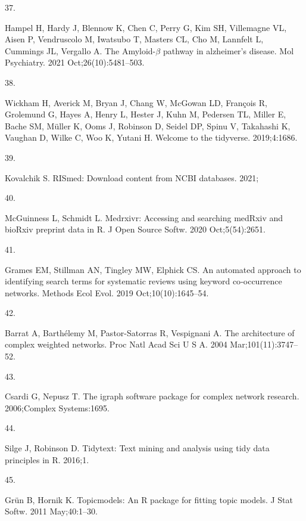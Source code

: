 \documentclass[
  a4paper,
]{article}
\newlength{\cslhangindent}
\newlength{\csllabelwidth}
\newlength{\cslentryspacingunit} %
\newenvironment{CSLReferences}[2] %
 {%
  \setlength{\parindent}{0pt}
  \ifodd #1
  \let\oldpar\par
  \def\par{\hangindent=\cslhangindent\oldpar}
  \fi
  \setlength{\parskip}{#2\cslentryspacingunit}
 }%
 {}
\newcommand{\CSLLeftMargin}[1]{\parbox[t]{\csllabelwidth}{#1}}
\newcommand{\CSLRightInline}[1]{\parbox[t]{\linewidth - \csllabelwidth}{#1}\break}
\begin{document}
\begin{CSLReferences}{0}{0}
\leavevmode{}%
\CSLLeftMargin{37. }%
\CSLRightInline{Hampel H, Hardy J, Blennow K, Chen C, Perry G, Kim SH,
Villemagne VL, Aisen P, Vendruscolo M, Iwatsubo T, Masters CL, Cho M,
Lannfelt L, Cummings JL, Vergallo A. The {Amyloid-\(\beta\)} pathway in
alzheimer's disease. Mol Psychiatry. 2021 Oct;26(10):5481--503. }

\leavevmode{}%
\CSLLeftMargin{38. }%
\CSLRightInline{Wickham H, Averick M, Bryan J, Chang W, McGowan LD,
François R, Grolemund G, Hayes A, Henry L, Hester J, Kuhn M, Pedersen
TL, Miller E, Bache SM, Müller K, Ooms J, Robinson D, Seidel DP, Spinu
V, Takahashi K, Vaughan D, Wilke C, Woo K, Yutani H. Welcome to the
{\textbackslashtextbraceleft}tidyverse{\textbackslashtextbraceright}.
2019;4:1686. }

\leavevmode{}%
\CSLLeftMargin{39. }%
\CSLRightInline{Kovalchik S. {RISmed}: Download content from {NCBI}
databases. 2021; }

\leavevmode{}%
\CSLLeftMargin{40. }%
\CSLRightInline{McGuinness L, Schmidt L. Medrxivr: Accessing and
searching medRxiv and bioRxiv preprint data in {R}. J Open Source Softw.
2020 Oct;5(54):2651. }

\leavevmode{}%
\CSLLeftMargin{41. }%
\CSLRightInline{Grames EM, Stillman AN, Tingley MW, Elphick CS. An
automated approach to identifying search terms for systematic reviews
using keyword co‐occurrence networks. Methods Ecol Evol. 2019
Oct;10(10):1645--54. }

\leavevmode{}%
\CSLLeftMargin{42. }%
\CSLRightInline{Barrat A, Barthélemy M, Pastor-Satorras R, Vespignani A.
The architecture of complex weighted networks. Proc Natl Acad Sci U S A.
2004 Mar;101(11):3747--52. }

\leavevmode{}%
\CSLLeftMargin{43. }%
\CSLRightInline{Csardi G, Nepusz T. The igraph software package for
complex network research. 2006;Complex Systems:1695. }

\leavevmode{}%
\CSLLeftMargin{44. }%
\CSLRightInline{Silge J, Robinson D. Tidytext: Text mining and analysis
using tidy data principles in {R}. 2016;1. }

\leavevmode{}%
\CSLLeftMargin{45. }%
\CSLRightInline{Grün B, Hornik K. Topicmodels: An {R} package for
fitting topic models. J Stat Softw. 2011 May;40:1--30. }


\end{CSLReferences}
\end{document}
